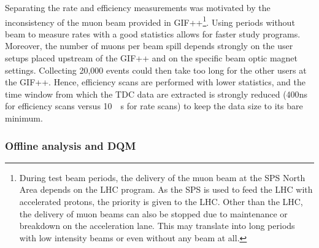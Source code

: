 	Separating the rate and efficiency measurements was motivated by the inconsistency of the muon beam provided in GIF++\footnote{During test beam periods, the delivery of the muon beam at the SPS North Area depends on the LHC program. As the SPS is used to feed the LHC with accelerated protons, the priority is given to the LHC. Other than the LHC, the delivery of muon beams can also be stopped due to maintenance or breakdown on the acceleration lane. This may translate into long periods with low intensity beams or even without any beam at all.}. Using periods without beam to measure rates with a good statistics allows for faster study programs. Moreover, the number of muons per beam spill depends strongly on the user setups placed upstream of the GIF++ and on the specific beam optic magnet settings. Collecting 20,000 events could then take too long for the other users at the GIF++. Hence, efficiency scans are performed with lower statistics, and the time window from which the TDC data are extracted is strongly reduced (\si{400}{ns} for efficiency scans versus \SI{10}{\mu s} for rate scans) to keep the data size to its bare minimum.
	
		\subsubsection{Offline analysis and \acl{DQM}}
		\label{chapt5:sssec:DQM}

